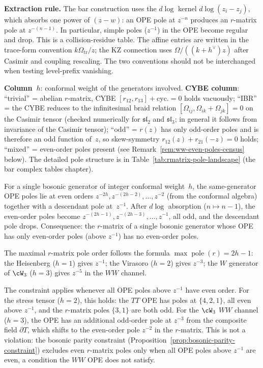 \noindent
\textbf{Extraction rule.}
The bar construction uses the $d\log$ kernel
$d\log(z_i - z_j)$, which absorbs one power of $(z{-}w)$:
an OPE pole at $z^{-n}$ produces an $r$-matrix pole at
$z^{-(n-1)}$. In particular, simple poles ($z^{-1}$) in the OPE
become regular and drop.
This is a collision-residue table. The affine entries are written in
the trace-form convention $k\Omega_{\mathrm{tr}}/z$; the KZ connection
uses $\Omega/((k+h^\vee)z)$ after Casimir and coupling rescaling. The
two conventions should not be interchanged when testing level-prefix
vanishing.

\textbf{Column~$h$}: conformal weight of the generators involved.
\textbf{CYBE column}: ``trivial'' = abelian $r$-matrix,
CYBE $[r_{12}, r_{13}] + \text{cyc.} = 0$ holds vacuously;
``IBR'' = the CYBE reduces to the infinitesimal braid relation
$[\Omega_{ij}, \Omega_{ik} + \Omega_{jk}] = 0$ on the Casimir
tensor (checked numerically for $\mathfrak{sl}_2$ and
$\mathfrak{sl}_3$; in general it follows from invariance of the
Casimir tensor);
``odd'' = $r(z)$ has only odd-order poles and is therefore an odd
function of~$z$, so skew-symmetry
$r_{12}(z) + r_{21}(-z) = 0$ holds;
``mixed'' = even-order poles present (see
Remark~\ref{rem:ww-even-poles-census} below).
The detailed pole structure is in
Table~\ref{tab:rmatrix-pole-landscape} (the bar complex
tables chapter).

\begin{remark}
\label{rem:bosonic-parity-census}
For a single bosonic generator of integer conformal weight~$h$,
the same-generator OPE poles lie at even orders
$z^{-2h}, z^{-(2h-2)}, \ldots, z^{-2}$ (from the conformal
algebra) together with a descendant pole at~$z^{-1}$. After
$d\log$ absorption ($n \mapsto n{-}1$), the even-order poles
become $z^{-(2h-1)}, z^{-(2h-3)}, \ldots, z^{-1}$, all odd,
and the descendant pole drops. Consequence: the $r$-matrix of a
single bosonic generator whose OPE has only even-order poles
(above $z^{-1}$) has no even-order poles.

The maximal $r$-matrix pole order follows the formula
$\max\operatorname{pole}(r) = 2h - 1$: the Heisenberg
($h = 1$) gives $z^{-1}$; the Virasoro ($h = 2$) gives $z^{-3}$;
the $W$ generator of $\cW_3$ ($h = 3$) gives $z^{-5}$ in the $WW$
channel.

The constraint applies whenever all OPE poles above $z^{-1}$
have even order. For the stress tensor ($h = 2$), this holds:
the $TT$ OPE has poles at $\{4, 2, 1\}$, all even above $z^{-1}$,
and the $r$-matrix poles $\{3, 1\}$ are both odd.
For the $\cW_3$ $WW$ channel ($h = 3$), the OPE has an additional
odd-order pole at $z^{-3}$ from the composite field $\partial T$,
which shifts to the even-order pole $z^{-2}$ in the $r$-matrix.
This is not a violation: the bosonic parity constraint
(Proposition~\ref{prop:bosonic-parity-constraint}) excludes even
$r$-matrix poles only when all OPE poles above $z^{-1}$ are even,
a condition the $WW$ OPE does not satisfy.
\end{remark}

